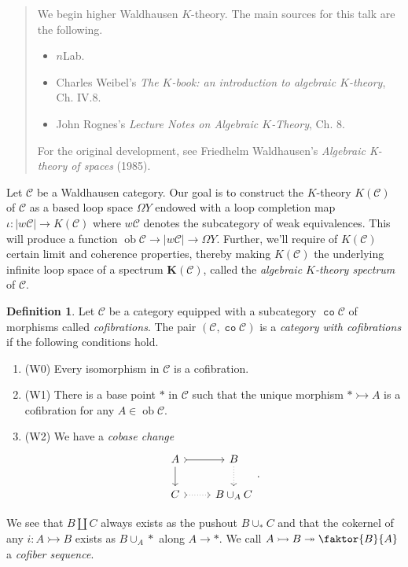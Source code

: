 \documentclass[10pt,letterpaper,cm]{nupset}
\theoremstyle{definition}
\newtheorem{definition}{Definition}
\theoremstyle{theorem}
\theoremstyle{remark}
\newcommand{\1}{\mathbf{1}}
\renewcommand{\c}{\mathscr{C}}
\newcommand{\0}{\vec 0}
\DeclareMathOperator{\co}{\mathtt{co}}
\DeclareMathOperator{\ob}{ob}
\begin{document}
\begin{abstract}
We begin higher Waldhausen $K$-theory. The main sources for this talk are the following.
\begin{itemize}
\item $n$Lab.
\item Charles Weibel's \textit{The $K$-book: an introduction to algebraic $K$-theory},  Ch. IV.8.
\item John Rognes's \textit{Lecture Notes on Algebraic $K$-Theory}, Ch. 8.
\end{itemize}
For the original development, see Friedhelm Waldhausen's \textit{Algebraic K-theory of spaces} (1985). 
\end{abstract}

\smallskip

Let $\c$ be a Waldhausen category. Our goal is to construct the $K$-theory $K(\c)$ of $\c$ as a based loop space $\Omega Y$ endowed with a loop completion map $ \iota : \lvert{w{\c}}\rvert \to K(\c)$ where $w{\c}$ denotes the subcategory of weak equivalences. This will produce a function $\ob \c \to \lvert{w{\c}}\rvert \to \Omega Y$. Further, we'll require of $K(\c)$ certain limit and coherence properties, thereby making $K(\c)$ the underlying infinite loop space of a spectrum $\mathbf{K}(\c)$, called the \textit{algebraic $K$-theory spectrum} of $\c$.


\begin{definition}
Let $\c$ be a category equipped with a subcategory $\co{\c}$ of morphisms called \textit{cofibrations}. The pair $\left(\c, \co{\c}\right)$ is a \textit{category with cofibrations} if the following conditions hold.
\begin{enumerate}
\item (W0) Every isomorphism in $\c$ is a cofibration.
\item (W1) There is a base point $\ast$ in $\c$ such that the unique morphism $\ast \rightarrowtail A$ is a cofibration for any $A \in \ob \c$.
\item (W2) We have a \textit{cobase change}
\[
\begin{tikzcd}
A \arrow[d] \arrow[r, tail] & B \arrow[d, dotted] \\
C \arrow[r, dotted, tail] & B \cup_A C
\end{tikzcd}.
\]
\end{enumerate}
\end{definition}


We see that $B \coprod C$ always exists as the pushout $B \cup_{\ast} C$ and that the cokernel of any $i : A \rightarrowtail B$ exists as $B \cup_A \ast$ along $A \to \ast$. We call $A \rightarrowtail  B \twoheadrightarrow \faktor{B}{A}$ a \textit{cofiber sequence}.
\end{document}
